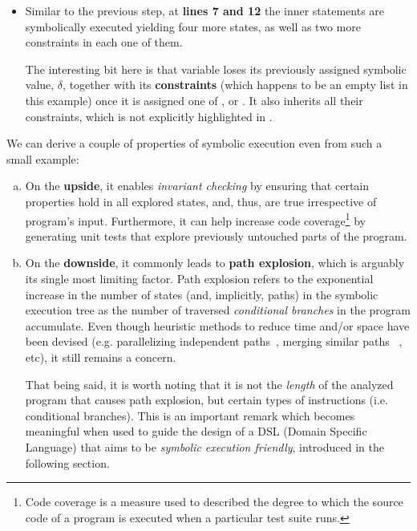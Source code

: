 \begin{itemize}
  \item Similar to the previous step, at \textbf{lines 7 and 12} the inner
     statements are symbolically executed yielding four
    more states, as well as two more constraints in each one of them.

    The interesting bit here is that variable \vmax{} loses its previously
    assigned symbolic value, $\delta$, together with its \textbf{constraints}
    (which happens to be an empty list in this example) once it is assigned one
    of \pa{}, \pb{} or \pc{}.  It also inherits all their constraints, which is
    not explicitly highlighted in .
\end{itemize}

We can derive a couple of properties of symbolic execution even from such a
small example:
\begin{enumerate}[a)]
  \item On the \textbf{upside}, it enables \emph{invariant checking} by
    ensuring that certain properties hold in all explored states, and, thus,
    are true irrespective of program's input.  Furthermore, it can help
    increase code coverage\footnote{Code coverage is a measure used to
    described the degree to which the source code of a program is executed when
    a particular test suite runs.} by generating unit tests that explore
    previously untouched parts of the program.

  \item On the \textbf{downside}, it commonly leads to \textbf{path explosion},
    which is arguably its single most limiting factor. Path explosion refers to
    the exponential increase in the number of states (and, implicitly, paths)
    in the symbolic execution tree as the number of traversed \emph{conditional
    branches} in the program accumulate. Even though heuristic methods to
    reduce time and/or space have been devised (e.g. parallelizing independent
    paths~\cite{staats2010parallel}, merging similar paths
   ~\cite{kuznetsov2012efficient}, etc), it still remains a concern.

    That being said, it is worth noting that it is not the \emph{length} of the
    analyzed program that causes path explosion, but certain types of
    instructions (i.e.  conditional branches).  This is an important remark
    which becomes meaningful when used to guide the design of a DSL (Domain
    Specific Language) that aims to be
    \emph{symbolic execution friendly}, introduced in the following section.
\end{enumerate}


